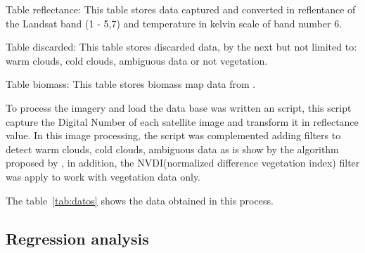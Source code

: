 Table reflectance: This table stores data captured and converted in reflentance of the Landsat band (1 - 5,7) and temperature in kelvin scale of band number 6.

Table discarded: This table stores discarded data, by the next but not limited to: warm clouds, cold clouds, ambiguous data or not vegetation.

Table biomass: This table stores biomass map data from \cite{baccini2008afirst}.

To process the imagery and load the data base was written an script, this script capture the Digital Number of each satellite image and transform it in reflectance value. In this image processing, the script was complemented adding filters to detect warm clouds, cold clouds, ambiguous data as is show by the algorithm proposed by \cite{irish2000landsat}, in addition, the NVDI(normalized difference vegetation index) filter was apply to work with vegetation data only.

The table~\ref{tab:datos} shows the data obtained in this process.

\begin{table}
\caption{Data generated in process and data cleaning}
\label{tab:datos}
\centering
{}
\end{table}

\subsection{Regression analysis}

